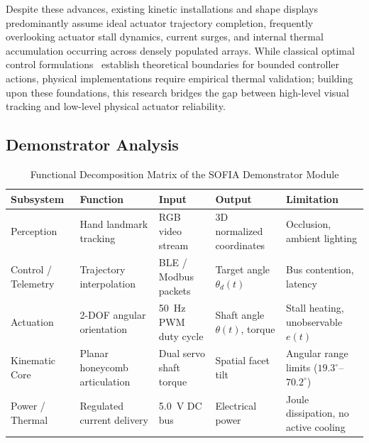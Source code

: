 \documentclass[lettersize,journal]{IEEEtran}
\begin{document}
	Despite these advances, existing kinetic installations and shape displays~\cite{follmer2013inform,nakagaki2016transform,seo2019modular} predominantly assume ideal actuator trajectory completion, frequently overlooking actuator stall dynamics, current surges, and internal thermal accumulation occurring across densely populated arrays. While classical optimal control formulations~\cite{kirk2004optimal} establish theoretical boundaries for bounded controller actions, physical implementations require empirical thermal validation; building upon these foundations, this research bridges the gap between high-level visual tracking and low-level physical actuator reliability.
	
	\subsection{Demonstrator Analysis}
	\label{sec:demonstrator_analysis}
	
	\begin{table}[!b]
		\centering
		\caption{Functional Decomposition Matrix of the SOFIA Demonstrator Module}
		\label{tab:functional_matrix}
		\scriptsize
		\renewcommand{\arraystretch}{1.08}
		\begin{tabular}{p{1.3cm} p{1.6cm} p{1.4cm} p{1.4cm} p{1.4cm}}
			\toprule
			\textbf{Subsystem} & \textbf{Function} & \textbf{Input} & \textbf{Output} & \textbf{Limitation} \\
			\midrule
			Perception & Hand landmark tracking & RGB video stream & 3D normalized coordinates & Occlusion, ambient lighting \\
			Control / Telemetry & Trajectory interpolation & BLE / Modbus packets & Target angle $\theta_d(t)$ & Bus contention, latency \\
			Actuation & 2-DOF angular orientation & 50~Hz PWM duty cycle & Shaft angle $\theta(t)$, torque & Stall heating, unobservable $e(t)$ \\
			Kinematic Core & Planar honeycomb articulation & Dual servo shaft torque & Spatial facet tilt & Angular range limits ($19.3^\circ$--$70.2^\circ$) \\
			Power / Thermal & Regulated current delivery & 5.0~V DC bus & Electrical power & Joule dissipation, no active cooling \\
			\bottomrule
		\end{tabular}
	\end{table}
	
\end{document}

